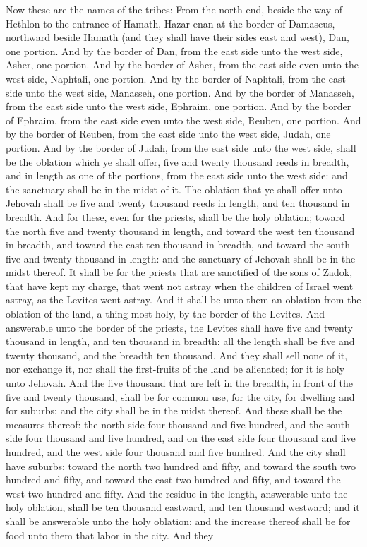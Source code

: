 Now these are the names of the tribes: From the north end, beside the way of Hethlon to the entrance of Hamath, Hazar-enan at the border of Damascus, northward beside Hamath (and they shall have their sides east and west), Dan, one portion. And by the border of Dan, from the east side unto the west side, Asher, one portion. And by the border of Asher, from the east side even unto the west side, Naphtali, one portion. And by the border of Naphtali, from the east side unto the west side, Manasseh, one portion. And by the border of Manasseh, from the east side unto the west side, Ephraim, one portion. And by the border of Ephraim, from the east side even unto the west side, Reuben, one portion. And by the border of Reuben, from the east side unto the west side, Judah, one portion.  And by the border of Judah, from the east side unto the west side, shall be the oblation which ye shall offer, five and twenty thousand reeds in breadth, and in length as one of the portions, from the east side unto the west side: and the sanctuary shall be in the midst of it. The oblation that ye shall offer unto Jehovah shall be five and twenty thousand reeds in length, and ten thousand in breadth. And for these, even for the priests, shall be the holy oblation; toward the north five and twenty thousand in length, and toward the west ten thousand in breadth, and toward the east ten thousand in breadth, and toward the south five and twenty thousand in length: and the sanctuary of Jehovah shall be in the midst thereof. It shall be for the priests that are sanctified of the sons of Zadok, that have kept my charge, that went not astray when the children of Israel went astray, as the Levites went astray. And it shall be unto them an oblation from the oblation of the land, a thing most holy, by the border of the Levites.  And answerable unto the border of the priests, the Levites shall have five and twenty thousand in length, and ten thousand in breadth: all the length shall be five and twenty thousand, and the breadth ten thousand. And they shall sell none of it, nor exchange it, nor shall the first-fruits of the land be alienated; for it is holy unto Jehovah.  And the five thousand that are left in the breadth, in front of the five and twenty thousand, shall be for common use, for the city, for dwelling and for suburbs; and the city shall be in the midst thereof. And these shall be the measures thereof: the north side four thousand and five hundred, and the south side four thousand and five hundred, and on the east side four thousand and five hundred, and the west side four thousand and five hundred. And the city shall have suburbs: toward the north two hundred and fifty, and toward the south two hundred and fifty, and toward the east two hundred and fifty, and toward the west two hundred and fifty. And the residue in the length, answerable unto the holy oblation, shall be ten thousand eastward, and ten thousand westward; and it shall be answerable unto the holy oblation; and the increase thereof shall be for food unto them that labor in the city. And they 
